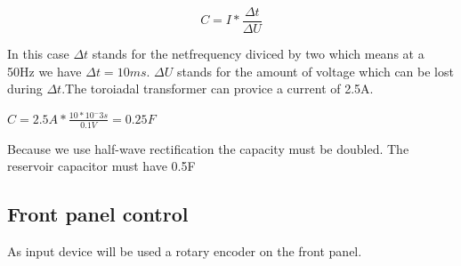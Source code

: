 \begin{equation}
	C=I*\frac{\Delta t}{\Delta U}
	\label{reservoidCapacitor}
\end{equation} 

In this case $\Delta t$ stands for the netfrequency diviced by two which means at a 50Hz we have $\Delta t = 10ms$. $\Delta U$ stands for the amount of voltage which can be lost during $\Delta t$.The toroiadal transformer can provice a current of 2.5A. 
\begin{center}
	$C=2.5A * \frac{10*10^-3s}{0.1V}=0.25F$
\end{center}
Because we use half-wave rectification the capacity must be doubled. The reservoir capacitor must have 0.5F


\subsection{Front panel control}
As input device will be used a rotary encoder on the front panel.
